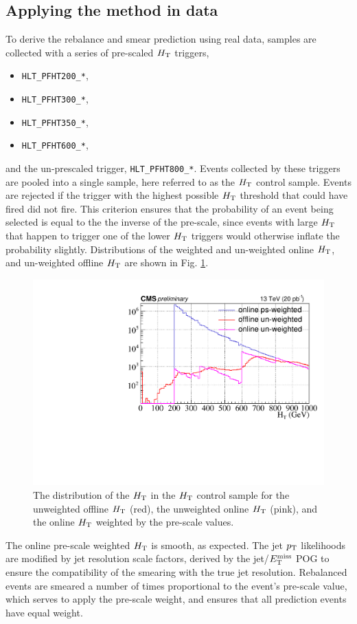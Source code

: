 \subsection{Applying the method in data}
To derive the rebalance and smear prediction using real data, samples are collected with a series of pre-scaled $H_{\rm T}$ triggers,
\begin{itemize}
  \item \texttt{HLT\_PFHT200\_*},
    \item \texttt{HLT\_PFHT300\_*},
      \item \texttt{HLT\_PFHT350\_*},
        \item \texttt{HLT\_PFHT600\_*},
\end{itemize}
and the un-prescaled trigger, \texttt{HLT\_PFHT800\_*}.
Events collected by these triggers are pooled into a single sample, here referred to as the $H_{\rm T}$ control sample. Events are rejected if the trigger with the highest possible $H_{\rm T}$ threshold that could have fired did not fire. This criterion ensures that the probability of an event being selected is equal to the the inverse of the pre-scale, since events with large $H_{\rm T}$ that happen to trigger one of the lower $H_{\rm T}$ triggers would otherwise inflate the probability slightly. Distributions of the weighted and un-weighted online $H_{\rm T}$, and un-weighted offline $H_{\rm T}$ are shown in Fig. \ref{fig:PrescaleWeights}.
\begin{figure}[h]
\centering
\includegraphics[width=0.6\linewidth]{figures/SusySearches/Ra2b2016/PrescaleWeightsHT2.pdf}
\caption{The distribution of the $H_{\rm T}$ in the $H_{\rm T}$ control sample for the unweighted offline $H_{\rm T}$ (red), the unweighted online $H_{\rm T}$ (pink), and the online $H_{\rm T}$ weighted by the pre-scale values.}
\label{fig:PrescaleWeights}
\end{figure}
The online pre-scale weighted $H_{\rm T}$ is smooth, as expected. The jet $p_{\text{T}}$ likelihoods are modified by jet resolution scale factors, derived by the jet/$E_{\text{T}}^{\rm miss}$ POG \cite{jetmet2} to ensure the compatibility of the smearing with the true jet resolution. Rebalanced events are smeared a number of times proportional to the event's pre-scale value, which serves to apply the pre-scale weight, and ensures that all prediction events have equal weight.

